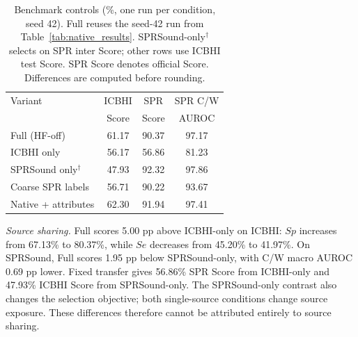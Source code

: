\begin{table}[!htbp]
\caption{Benchmark controls (\%, one run per condition, seed 42).
Full reuses the seed-42 run from Table~\ref{tab:native_results}.
SPRSound-only$^\dagger$ selects on SPR inter Score;
other rows use ICBHI test Score. SPR Score denotes official Score.
Differences are computed before rounding.}
\label{tab:ablations}
\centering
\small
\setlength{\tabcolsep}{2.5pt}
\begin{tabular*}{\columnwidth}{@{\extracolsep{\fill}}lccc@{}}
\toprule
Variant & ICBHI & SPR & SPR C/W\\
& Score & Score & AUROC\\
\midrule
Full (HF-off) & 61.17 & 90.37 & 97.17\\
ICBHI only & 56.17 & 56.86 & 81.23\\
SPRSound only$^\dagger$ & 47.93 & 92.32 & 97.86\\
\midrule
Coarse SPR labels & 56.71 & 90.22 & 93.67\\
Native + attributes & 62.30 & 91.94 & 97.41\\
\bottomrule
\end{tabular*}
\end{table}

\textit{Source sharing.}
Full scores 5.00 pp above ICBHI-only on ICBHI:
$Sp$ increases from 67.13\% to 80.37\%, while $Se$ decreases from
45.20\% to 41.97\%. On SPRSound, Full scores 1.95 pp below SPRSound-only,
with C/W macro AUROC 0.69 pp lower.
Fixed transfer gives 56.86\% SPR Score from ICBHI-only and
47.93\% ICBHI Score from SPRSound-only.
The SPRSound-only contrast also changes the selection objective;
both single-source conditions change source exposure. These differences
therefore cannot be attributed entirely to source sharing.

